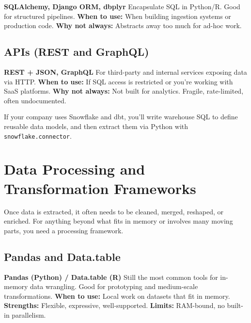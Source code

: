 \documentclass[12pt,openany]{book}
\begin{document}
\textbf{SQLAlchemy, Django ORM, dbplyr} \newline
Encapsulate SQL in Python/R. Good for structured pipelines. \newline
\textbf{When to use:} When building ingestion systems or production code. \newline
\textbf{Why not always:} Abstracts away too much for ad-hoc work.

\subsection*{APIs (REST and GraphQL)}

\textbf{REST + JSON, GraphQL} \newline
For third-party and internal services exposing data via HTTP. \newline
\textbf{When to use:} If SQL access is restricted or you're working with SaaS platforms. \newline
\textbf{Why not always:} Not built for analytics. Fragile, rate-limited, often undocumented.

\begin{examplebox}
If your company uses Snowflake and dbt, you’ll write warehouse SQL to define reusable data models, and then extract them via Python with \texttt{snowflake.connector}.
\end{examplebox}




\section{Data Processing and Transformation Frameworks}

Once data is extracted, it often needs to be cleaned, merged, reshaped, or enriched. For anything beyond what fits in memory or involves many moving parts, you need a processing framework.

\subsection*{Pandas and Data.table}

\textbf{Pandas (Python) / Data.table (R)} \newline
Still the most common tools for in-memory data wrangling. Good for prototyping and medium-scale transformations. \newline
\textbf{When to use:} Local work on datasets that fit in memory. \newline
\textbf{Strengths:} Flexible, expressive, well-supported. \newline
\textbf{Limits:} RAM-bound, no built-in parallelism.
\end{document}
